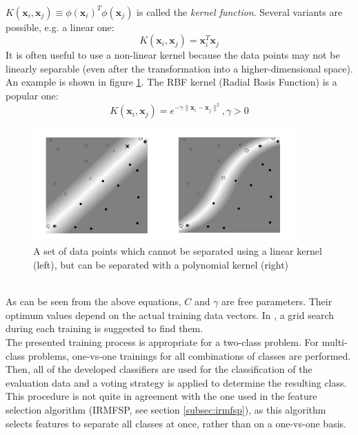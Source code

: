 \medskip
\\
$K(\mathbf{x}_{i},\mathbf{x}_{j}) \equiv \phi(\mathbf{x}_{i})^{T} \phi(\mathbf{x}_{j})$ is called the \textit{kernel function}. Several variants are possible, e.g. a linear one:
\begin{equation}
K(\mathbf{x}_{i},\mathbf{x}_{j}) = \mathbf{x}_{i}^{T}\mathbf{x}_{j}
\end{equation}
It is often useful to use a non-linear kernel because the data points may not be linearly separable (even after the transformation into a higher-dimensional space). An example is shown in figure \ref{fig:svm_kernels}. The RBF kernel (Radial Basis Function) is a popular one:
\begin{equation}
K(\mathbf{x}_{i},\mathbf{x}_{j}) = e^{-\gamma \parallel \mathbf{x}_{i} - \mathbf{x}_{j} \parallel^{2}}, \gamma > 0
\end{equation}
\begin{figure}[htbp]
	\centering
	\includegraphics[width=0.9\textwidth]{images/svm_kernels.png}
	\caption{A set of data points which cannot be separated using a linear kernel (left), but can be separated with a polynomial kernel (right) \cite{article:svm_tutorial}}
	\label{fig:svm_kernels}
\end{figure}
\medskip
\\
As can be seen from the above equations, $C$ and $\gamma$ are free parameters. Their optimum values depend on the actual training data vectors. In \cite{techreport:practical_svm}, a grid search during each training is suggested to find them. 
\medskip
\\
The presented training process is appropriate for a two-class problem. For multi-class problems, one-vs-one trainings for all combinations of classes are performed. Then, all of the developed classifiers are used for the classification of the evaluation data and a voting strategy is applied to determine the resulting class. This procedure is not quite in agreement with the one used in the feature selection algorithm (IRMFSP, see section \ref{subsec:irmfsp}), as this algorithm selects features to separate all classes at once, rather than on a one-vs-one basis.


